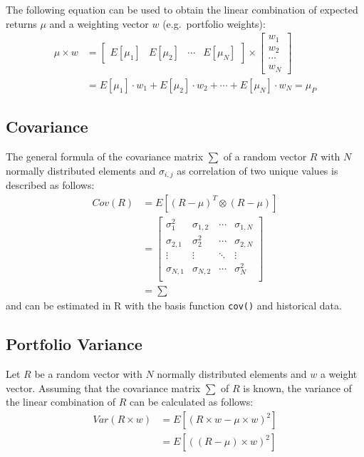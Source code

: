 \documentclass[
  oneside]{book}
\begin{document}
The following equation can be used to obtain the linear combination of expected returns \(\mu\) and a weighting vector \(w\) (e.g.~portfolio weights):
\begin{align*}
 \mu \times w &=
  \begin{bmatrix}
    E[\mu_{1}] & E[\mu_{2}] & \cdots & E[\mu_{N}]
 \end{bmatrix}
  \times 
  \begin{bmatrix}
    w_{1} \\ 
    w_{2} \\
    \cdots \\
    w_{N}  
 \end{bmatrix} \\
 &=
 E[\mu_{1}] \cdot w_1 + E[\mu_{2}] \cdot w_2 + \cdots + E[\mu_{N}] \cdot w_{N} 
 =
 \mu_P
\end{align*}

\hypertarget{covariance}{%
\subsection{Covariance}\label{covariance}}

The general formula of the covariance matrix \(\textstyle\sum\) of a random vector \(R\) with \(N\) normally distributed elements and \(\sigma_{i,j}\) as correlation of two unique values is described as follows:
\begin{align*}
  Cov(R) &= E[(R-\mu)^T \otimes (R-\mu)] \\
  &=   \begin{bmatrix}
    \sigma_1^2 & \sigma_{1,2} & \cdots & \sigma_{1,N} \\
    \sigma_{2, 1} & \sigma_2^2 & \cdots & \sigma_{2, N} \\
    \vdots  & \vdots & \ddots & \vdots \\
    \sigma_{N, 1} & \sigma_{N, 2} & \cdots & \sigma_N^2 \\
 \end{bmatrix}\\
  &=\textstyle\sum
\end{align*}
and can be estimated in R with the basis function \texttt{cov()} and historical data.

\hypertarget{portvar}{%
\subsection{Portfolio Variance}\label{portvar}}

Let \(R\) be a random vector with \(N\) normally distributed elements and \(w\) a weight vector. Assuming that the covariance matrix \(\sum\) of \(R\) is known, the variance of the linear combination of \(R\) can be calculated as follows:
\begin{align*}
  Var(R \times w) &= E[(R \times w - \mu \times w)^2] \\
  &= E[((R - \mu) \times w)^2]
\end{align*}
\end{document}
